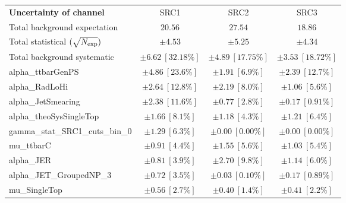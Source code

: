 
\begin{table}
\begin{center}
\setlength{\tabcolsep}{0.0pc}
\begin{tabular*}{\textwidth}{@{\extracolsep{\fill}}lccc}
\noalign{\smallskip}\hline\noalign{\smallskip}
{\bf Uncertainty of channel}                                    & SRC1            & SRC2            & SRC3            \\
\noalign{\smallskip}\hline\noalign{\smallskip}
Total background expectation             &  $20.56$        &  $27.54$        &  $18.86$       \\
\noalign{\smallskip}\hline\noalign{\smallskip}
Total statistical $(\sqrt{N_{\rm exp}})$              & $\pm 4.53$        & $\pm 5.25$        & $\pm 4.34$       \\
Total background systematic               & $\pm 6.62\ [32.18\%] $        & $\pm 4.89\ [17.75\%] $        & $\pm 3.53\ [18.72\%] $             \\
\noalign{\smallskip}\hline\noalign{\smallskip}
\noalign{\smallskip}\hline\noalign{\smallskip}
alpha\_ttbarGenPS         & $\pm 4.86\ [23.6\%] $          & $\pm 1.91\ [6.9\%] $          & $\pm 2.39\ [12.7\%] $       \\
alpha\_RadLoHi         & $\pm 2.64\ [12.8\%] $          & $\pm 2.19\ [8.0\%] $          & $\pm 1.06\ [5.6\%] $       \\
alpha\_JetSmearing         & $\pm 2.38\ [11.6\%] $          & $\pm 0.77\ [2.8\%] $          & $\pm 0.17\ [0.91\%] $       \\
alpha\_theoSysSingleTop         & $\pm 1.66\ [8.1\%] $          & $\pm 1.18\ [4.3\%] $          & $\pm 1.21\ [6.4\%] $       \\
gamma\_stat\_SRC1\_cuts\_bin\_0         & $\pm 1.29\ [6.3\%] $          & $\pm 0.00\ [0.00\%] $          & $\pm 0.00\ [0.00\%] $       \\
mu\_ttbarC         & $\pm 0.91\ [4.4\%] $          & $\pm 1.55\ [5.6\%] $          & $\pm 1.03\ [5.4\%] $       \\
alpha\_JER         & $\pm 0.81\ [3.9\%] $          & $\pm 2.70\ [9.8\%] $          & $\pm 1.14\ [6.0\%] $       \\
alpha\_JET\_GroupedNP\_3         & $\pm 0.72\ [3.5\%] $          & $\pm 0.03\ [0.10\%] $          & $\pm 0.17\ [0.89\%] $       \\
mu\_SingleTop         & $\pm 0.56\ [2.7\%] $          & $\pm 0.40\ [1.4\%] $          & $\pm 0.41\ [2.2\%] $       \\

\end{tabular*}
\end{center}
\end{table}
